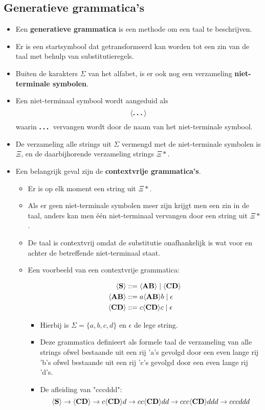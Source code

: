 \subsection{Generatieve grammatica's}
\begin{itemize}
    \item Een \textbf{generatieve grammatica} is een methode om een taal te beschrijven.
    \item Er is een startsymbool dat getransformeerd kan worden tot een zin van de taal met behulp van substitutieregels.
    \item Buiten de karakters $\Sigma$ van het alfabet, is er ook nog een verzameling \textbf{niet-terminale symbolen}.
    \item Een niet-terminaal symbool wordt aangeduid als
        $$\langle \textbf{\dots} \rangle$$
        waarin $\textbf{\dots}$ vervangen wordt door de naam van het niet-terminale symbool. 
    \item De verzameling alle strings uit $\Sigma$ vermengd met de niet-terminale symbolen is $\Xi$, en de daarbijhorende verzameling strings $\Xi*$.
    \item Een belangrijk geval zijn de \textbf{contextvrije grammatica's}.
    \begin{itemize}
        \item Er is op elk moment een string uit $\Xi*$.
        \item Als er geen niet-terminale symbolen meer zijn krijgt men een zin in de taal, anders kan men één niet-terminaal vervangen door een string uit $\Xi*$.
        \item De taal is contextvrij omdat de substitutie onafhankelijk is wat voor en achter de betreffende niet-terminaal staat.
        \item Een voorbeeld van een contextvrije grammatica:

        \begin{align*}
             \langle \textbf{S} \rangle &::= \langle \textbf{AB} \rangle\;|\;\langle \textbf{CD} \rangle \\
             \langle \textbf{AB} \rangle &::= a\langle \textbf{AB} \rangle b\;|\;\epsilon \\
             \langle \textbf{CD} \rangle &::= c\langle \textbf{CD} \rangle c\;|\;\epsilon
        \end{align*}
        \begin{itemize}
            \item Hierbij is $\Sigma = \{ a, b, c, d \}$ en $\epsilon$ de lege string.
            \item Deze grammatica definieert als formele taal de verzameling van alle strings ofwel bestaande uit een rij 'a's gevolgd door een even lange rij 'b's ofwel bestaande uit een rij 'c's gevolgd door een even lange rij 'd's.    
            \item De afleiding van "cccddd":
            $$\langle \textbf{S} \rangle \rightarrow \langle \textbf{CD} \rangle \rightarrow c\langle \textbf{CD} \rangle d \rightarrow cc\langle \textbf{CD} \rangle dd \rightarrow ccc\langle \textbf{CD} \rangle ddd \rightarrow cccddd$$
        \end{itemize}
    \end{itemize}
\end{itemize}

